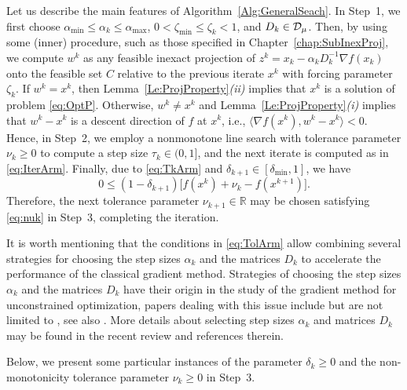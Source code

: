 \bigskip

Let us describe the main features of Algorithm~\ref{Alg:GeneralSeach}. In Step~1,  we first  choose   $\alpha_{\min}\leq \alpha_k \leq \alpha_{\max}$, $0 < \zeta_{\min} \leq \zeta_k  < 1$, and  $D_k\in  {\cal D}_{\mu}$. Then, by using some (inner) procedure, such as those specified in Chapter~\ref{chap:SubInexProj}, we compute $w^k$ as any feasible inexact projection of $z^k = x_k - \alpha_kD_k^{-1}\nabla f(x_k)$ onto the feasible set $C$ relative to the previous iterate $x^k$ with forcing parameter $\zeta_k$. If $w^k= x^k$, then Lemma~\ref{Le:ProjProperty}{\it (ii)} implies that $x^{k}$ is a solution of  problem \eqref{eq:OptP}.  Otherwise,  $w^k\neq  x^k$ and Lemma~\ref{Le:ProjProperty}{\it (i)}  implies  that $ w^k- x^k$ is a descent direction of $f$ at $x^k$, i.e.,  $\langle \nabla f(x^k), w^k- x^k \rangle < 0$.    Hence, in Step~2, we employ a nonmonotone line search  with tolerance parameter $\nu_k\geq 0$ to compute a step size  $\tau_k \in (0, 1]$,  and  the next iterate is computed as in \eqref{eq:IterArm}. Finally, due to  \eqref{eq:TkArm} and  $\delta_{k+1}\in [\delta_{\min}, 1]$, we have $$0\leq (1-\delta_{k+1})\big[f(x^{k})+\nu_{k}-  f(x^{k+1})\big].$$  Therefore, the next   tolerance parameter $\nu_{k+1}\in {\mathbb R}$ may be chosen satisfying \eqref{eq:nuk}  in Step~3, completing the iteration.

It is worth mentioning that the conditions in \eqref{eq:TolArm}  allow combining several strategies for choosing the step sizes $\alpha_k$  and the matrices $D_k$  to accelerate the performance of the classical gradient method.   Strategies  of choosing the step sizes $\alpha_k$  and the matrices $D_k$ have their origin in the study of the gradient  method  for unconstrained  optimization,  papers dealing with this issue include  but are not limited to \cite{BB1988, DaiHage2006, Serafino2018, Friedlander1999, Dai2006}, see also  \cite{BonettiniPrato2015, DaiFletcher2005, DaiFletcher2006, Polyak_Levitin1966}. More details  about   selecting  step sizes $\alpha_k$  and matrices $D_k$  may be found in the recent  review  \cite{bonettini2019recent} and  references therein.


Below, we present some  particular instances  of the parameter   $\delta_k\geq 0$ and  the non-monotonicity tolerance parameter $ \nu_ {k} \geq 0$  in Step~3.

